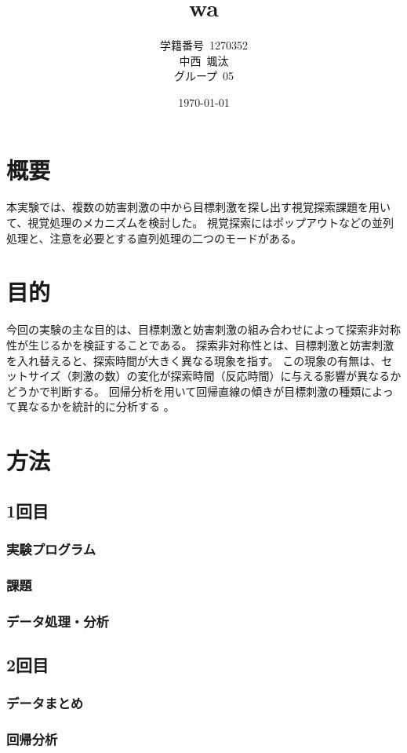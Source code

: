\documentclass{jlreq}
\title{wa}
\author{学籍番号~1270352\\
        中西~颯汰\\
        グループ~05\\
        }
\date{\today}
\begin{document}
\maketitle
\clearpage
\tableofcontents
\clearpage
\section{概要}
本実験では、複数の妨害刺激の中から目標刺激を探し出す視覚探索課題を用いて、視覚処理のメカニズムを検討した。
視覚探索にはポップアウトなどの並列処理と、注意を必要とする直列処理の二つのモードがある。



\section{目的}
今回の実験の主な目的は、目標刺激と妨害刺激の組み合わせによって探索非対称性が生じるかを検証することである。
探索非対称性とは、目標刺激と妨害刺激を入れ替えると、探索時間が大きく異なる現象を指す。
この現象の有無は、セットサイズ（刺激の数）の変化が探索時間（反応時間）に与える影響が異なるかどうかで判断する。
回帰分析を用いて回帰直線の傾きが目標刺激の種類によって異なるかを統計的に分析する 。
\section{方法}
\subsection{1回目}
\subsubsection*{実験プログラム}
\subsubsection*{課題}
\subsubsection*{データ処理・分析}

\subsection{2回目}
\subsubsection*{データまとめ}
\subsubsection*{回帰分析}
\end{document}
